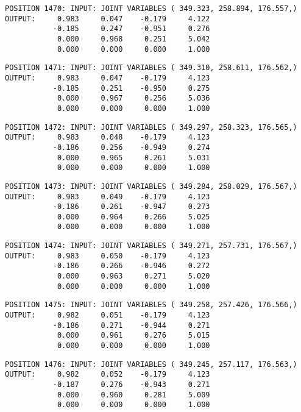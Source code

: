 \begin{verbatim}
POSITION 1470: INPUT: JOINT VARIABLES ( 349.323, 258.894, 176.557,)
OUTPUT:     0.983     0.047    -0.179     4.122
           -0.185     0.247    -0.951     0.276
            0.000     0.968     0.251     5.042
            0.000     0.000     0.000     1.000
\end{verbatim} \pagebreak[1]\begin{verbatim}
POSITION 1471: INPUT: JOINT VARIABLES ( 349.310, 258.611, 176.562,)
OUTPUT:     0.983     0.047    -0.179     4.123
           -0.185     0.251    -0.950     0.275
            0.000     0.967     0.256     5.036
            0.000     0.000     0.000     1.000
\end{verbatim} \pagebreak[1]\begin{verbatim}
POSITION 1472: INPUT: JOINT VARIABLES ( 349.297, 258.323, 176.565,)
OUTPUT:     0.983     0.048    -0.179     4.123
           -0.186     0.256    -0.949     0.274
            0.000     0.965     0.261     5.031
            0.000     0.000     0.000     1.000
\end{verbatim} \pagebreak[1]\begin{verbatim}
POSITION 1473: INPUT: JOINT VARIABLES ( 349.284, 258.029, 176.567,)
OUTPUT:     0.983     0.049    -0.179     4.123
           -0.186     0.261    -0.947     0.273
            0.000     0.964     0.266     5.025
            0.000     0.000     0.000     1.000
\end{verbatim} \pagebreak[1]\begin{verbatim}
POSITION 1474: INPUT: JOINT VARIABLES ( 349.271, 257.731, 176.567,)
OUTPUT:     0.983     0.050    -0.179     4.123
           -0.186     0.266    -0.946     0.272
            0.000     0.963     0.271     5.020
            0.000     0.000     0.000     1.000
\end{verbatim} \pagebreak[1]\begin{verbatim}
POSITION 1475: INPUT: JOINT VARIABLES ( 349.258, 257.426, 176.566,)
OUTPUT:     0.982     0.051    -0.179     4.123
           -0.186     0.271    -0.944     0.271
            0.000     0.961     0.276     5.015
            0.000     0.000     0.000     1.000
\end{verbatim} \pagebreak[1]\begin{verbatim}
POSITION 1476: INPUT: JOINT VARIABLES ( 349.245, 257.117, 176.563,)
OUTPUT:     0.982     0.052    -0.179     4.123
           -0.187     0.276    -0.943     0.271
            0.000     0.960     0.281     5.009
            0.000     0.000     0.000     1.000
\end{verbatim} \pagebreak[1]\begin{verbatim}

\end{verbatim}
